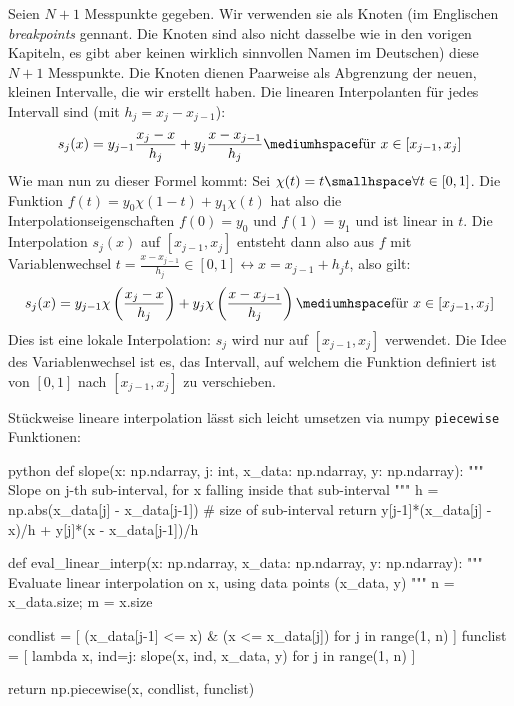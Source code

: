 Seien $N + 1$ Messpunkte gegeben. Wir verwenden sie als Knoten 
(im Englischen \textit{breakpoints} gennant. Die Knoten sind also nicht dasselbe wie in den vorigen Kapiteln, es gibt aber keinen wirklich sinnvollen Namen im Deutschen)
diese $N + 1$ Messpunkte. Die Knoten dienen Paarweise als Abgrenzung der neuen, kleinen Intervalle, die wir erstellt haben. 
Die linearen Interpolanten für jedes Intervall sind (mit $h_j = x_j - x_{j - 1}$):
\begin{align*}
    s_j(x) = y_{j - 1}\frac{x_j - x}{h_j} + y_j \frac{x - x_{j - 1}}{h_j} \mediumhspace \text{für } x \in [x_{j - 1}, x_j]
\end{align*}
Wie man nun zu dieser Formel kommt:
Sei $\chi(t) = t \smallhspace \forall t \in [0, 1]$. 
Die Funktion $f(t) = y_0 \chi(1 - t) + y_1 \chi(t)$ hat also die Interpolationseigenschaften $f(0) = y_0$ und $f(1) = y_1$ und ist linear in $t$.
Die Interpolation $s_j(x)$ auf $[x_{j - 1}, x_j]$ entsteht dann also aus $f$ mit Variablenwechsel $t = \frac{x - x_{j - 1}}{h_j} \in [0, 1] \leftrightarrow x = x_{j - 1} + h_j t$,
also gilt:
\begin{align*}
    s_j(x) = y_{j - 1} \chi \left( \frac{x_j - x}{h_j} \right) + y_j \chi \left( \frac{x - x_{j - 1}}{h_j} \right) \mediumhspace \text{für } x \in [x_{j - 1}, x_j]
\end{align*}
Dies ist eine lokale Interpolation: $s_j$ wird nur auf $[x_{j-1},x_j]$ verwendet.
Die Idee des Variablenwechsel ist es, das Intervall, auf welchem die Funktion definiert ist von $[0, 1]$ nach $[x_{j - 1}, x_j]$ zu verschieben.

\innumpy Stückweise lineare interpolation lässt sich leicht umsetzen via numpy \verb|piecewise| Funktionen:

\begin{code}{python}
def slope(x: np.ndarray, j: int, x_data: np.ndarray, y: np.ndarray):
    """ Slope on j-th sub-interval, for x falling inside that sub-interval """
    h = np.abs(x_data[j] - x_data[j-1])   # size of sub-interval
    return y[j-1]*(x_data[j] - x)/h + y[j]*(x - x_data[j-1])/h


def eval_linear_interp(x: np.ndarray, x_data: np.ndarray, y: np.ndarray):
    """ Evaluate linear interpolation on x, using data points (x_data, y) """
    n = x_data.size; m = x.size
        
    condlist = [
        (x_data[j-1] <= x) & (x <= x_data[j])
        for j in range(1, n)
    ]
    funclist = [
        lambda x, ind=j: slope(x, ind, x_data, y)  
        for j in range(1, n)
    ]
    
    return np.piecewise(x, condlist, funclist)
\end{code}
